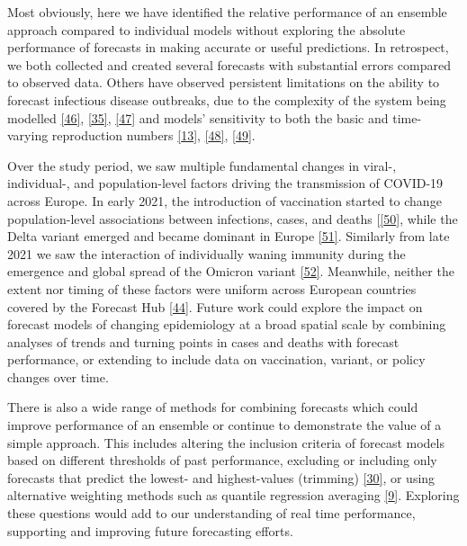 \documentclass[
]{article}
\begin{document}
Most obviously, here we have identified the relative performance of an
ensemble approach compared to individual models without exploring the
absolute performance of forecasts in making accurate or useful
predictions. In retrospect, we both collected and created several
forecasts with substantial errors compared to observed data. Others have
observed persistent limitations on the ability to forecast infectious
disease outbreaks, due to the complexity of the system being modelled
\protect\hyperlink{ref-scarpinoPredictabilityInfectiousDisease2019}{{[}46{]}},
\protect\hyperlink{ref-castroTurningPointEnd2020}{{[}35{]}},
\protect\hyperlink{ref-rosenkrantzFundamentalLimitationsEfficiently2022}{{[}47{]}}
and models' sensitivity to both the basic and time-varying reproduction
numbers
\protect\hyperlink{ref-viboudRAPIDDEbolaForecasting2018}{{[}13{]}},
\protect\hyperlink{ref-coriKeyDataOutbreak2017}{{[}48{]}},
\protect\hyperlink{ref-desaiRealtimeEpidemicForecasting2019}{{[}49{]}}.

Over the study period, we saw multiple fundamental changes in viral-,
individual-, and population-level factors driving the transmission of
COVID-19 across Europe. In early 2021, the introduction of vaccination
started to change population-level associations between infections,
cases, and deaths
{[}\protect\hyperlink{ref-europeancentrefordiseasepreventionandcontrolInterimGuidanceBenefits2021}{{[}50{]}},
while the Delta variant emerged and became dominant in Europe
\protect\hyperlink{ref-europeancentrefordiseasepreventionandcontrolThreatAssessmentBrief2021}{{[}51{]}}.
Similarly from late 2021 we saw the interaction of individually waning
immunity during the emergence and global spread of the Omicron variant
\protect\hyperlink{ref-europeancentrefordiseasepreventionandcontrolAssessmentFurtherSpread2022}{{[}52{]}}.
Meanwhile, neither the extent nor timing of these factors were uniform
across European countries covered by the Forecast Hub
\protect\hyperlink{ref-europeancentrefordiseasepreventionandcontrolOverviewImplementationCOVID192021}{{[}44{]}}.
Future work could explore the impact on forecast models of changing
epidemiology at a broad spatial scale by combining analyses of trends
and turning points in cases and deaths with forecast performance, or
extending to include data on vaccination, variant, or policy changes
over time.

There is also a wide range of methods for combining forecasts which
could improve performance of an ensemble or continue to demonstrate the
value of a simple approach. This includes altering the inclusion
criteria of forecast models based on different thresholds of past
performance, excluding or including only forecasts that predict the
lowest- and highest-values (trimming)
\protect\hyperlink{ref-taylorCombiningProbabilisticForecasts2021}{{[}30{]}},
or using alternative weighting methods such as quantile regression
averaging
\protect\hyperlink{ref-funkShorttermForecastsInform2020}{{[}9{]}}.
Exploring these questions would add to our understanding of real time
performance, supporting and improving future forecasting efforts.
\end{document}
